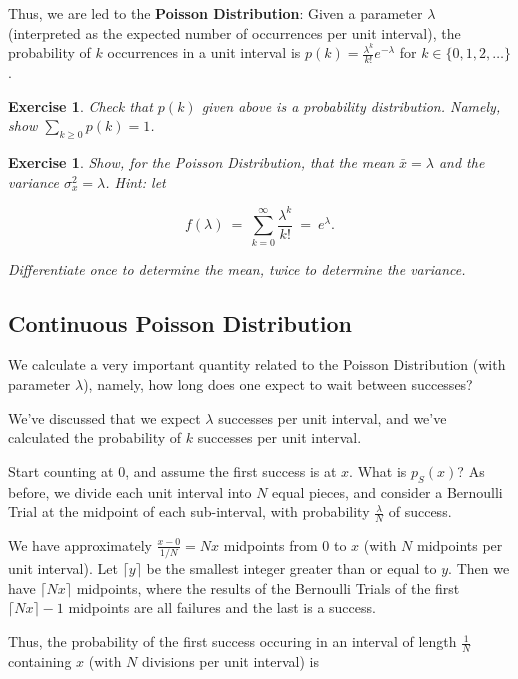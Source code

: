 \documentclass[12pt,letterpaper]{report}
\newcommand\be{\begin{equation}}
\newcommand\ee{\end{equation}}
\newtheorem{exe}[thm]{Exercise}
\begin{document}
Thus, we are led to the \textbf{Poisson Distribution}: Given a
parameter $\lambda$ (interpreted as the expected number of
occurrences per unit interval), the probability of $k$ occurrences
in a unit interval is $p(k) = \frac{\lambda^k}{k!}e^{-\lambda}$
for $k \in \{0, 1, 2, \dots \}$.

\begin{exe} Check that $p(k)$ given above is a probability
distribution. Namely, show $\sum_{k\ge 0} p(k) = 1$. \end{exe}

\begin{exe} Show, for the Poisson Distribution, that the mean
$\bar{x} = \lambda$ and the variance $\sigma^2_x = \lambda$. Hint:
let

\be f(\lambda) \ = \ \sum_{k=0}^\infty \frac{\lambda^k}{k!} \ = \
e^\lambda. \ee

Differentiate once to determine the mean, twice to determine the
variance.

\end{exe}

\subsection{Continuous Poisson Distribution}

We calculate a very important quantity related to the Poisson
Distribution (with parameter $\lambda$), namely, how long does one
expect to wait between successes?

We've discussed that we expect $\lambda$ successes per unit
interval, and we've calculated the probability of $k$ successes
per unit interval.

Start counting at $0$, and assume the first success is at $x$.
What is $p_S(x)$? As before, we divide each unit interval into $N$
equal pieces, and consider a Bernoulli Trial at the midpoint of
each sub-interval, with probability $\frac{\lambda}{N}$ of
success.

We have approximately $\frac{x-0}{1/N} = Nx$ midpoints from $0$ to
$x$ (with $N$ midpoints per unit interval). Let $\lceil y \rceil$
be the smallest integer greater than or equal to $y$. Then we have
$\lceil Nx \rceil$ midpoints, where the results of the Bernoulli
Trials of the first $\lceil Nx \rceil - 1$ midpoints are all
failures and the last is a success.

Thus, the probability of the first success occuring in an interval
of length $\frac{1}{N}$ containing $x$ (with $N$ divisions per
unit interval) is
\end{document}
